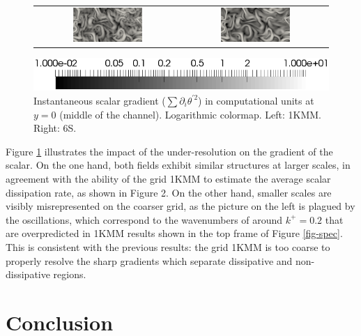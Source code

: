 \documentclass[review]{elsarticle}
\begin{document}
\begin{figure}[htbp]
\begin{center}
\begin{tabular}{cc}
\includegraphics[width=0.5\textwidth]{../visu/diss1KMM.png} & 
\includegraphics[width=0.5\textwidth]{../visu/diss6S.png}
\end{tabular}
\includegraphics[width=\textwidth]{../visu/diss_colorbar.png}
\end{center}
\caption{Instantaneous scalar gradient ($\sum \partial_i \theta^{\prime 2}$) in {\color{red} computational} units at $y=0$ (middle of the channel). Logarithmic colormap. Left: 1KMM. Right: 6S.}
\label{fig-visu}
\end{figure}

Figure \ref{fig-visu} illustrates the impact of the under-resolution on the gradient of the scalar. On the one hand, both fields exhibit similar structures at larger scales, in agreement with the ability of the grid 1KMM to estimate the average {\color{red}scalar} dissipation rate, as shown in Figure 2. On the other hand, smaller scales are visibly misrepresented on the coarser grid, as the picture on the left is plagued by the oscillations, which correspond to the wavenumbers of around $k^+=0.2$ that are overpredicted in 1KMM results shown in {\color{red}the top frame of} Figure \ref{fig-spec}. This is consistent with the previous results: the grid 1KMM is too coarse to properly resolve the sharp gradients which separate dissipative and non-dissipative regions.

\section{Conclusion}
\end{document}
